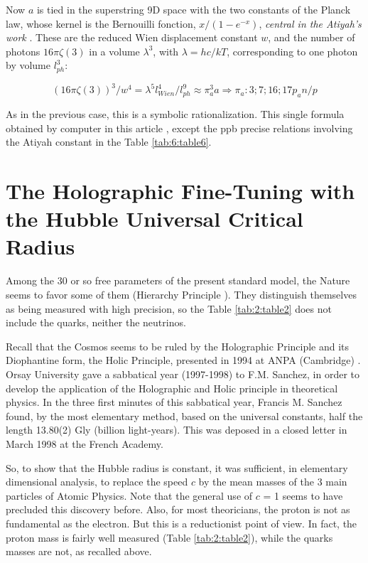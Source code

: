 \documentclass[a4paper,9pt]{article}
\begin{document}
Now $a$ is tied in the superstring 9D space with the two constants of the Planck law, whose kernel is the Bernouilli fonction, $x/(1-e^{-x})$, \textit {central in the Atiyah's work} \cite{Atiyah}. These are the reduced Wien displacement constant $w$, and the number of photons $16\pi \zeta(3)$ in a volume $\lambda^3$, with $\lambda = hc/kT $, corresponding to one photon by volume $l_{ph}^3$:

\begin{equation}
(16\pi\zeta(3))^3/w^4 = \lambda^5l_{Wien}^4/l_{ph}^9 \approx \pi_a^3a    \Rightarrow     \pi_a: 3;7;16;17p_an/p
\end{equation}

As in the previous case, this is a symbolic rationalization. This single formula obtained by computer in this article \cite{LaGuer}, except the ppb precise relations involving the Atiyah constant in the Table \ref{tab:6:table6}.








\section{The Holographic Fine-Tuning with the Hubble Universal Critical Radius}

Among the 30 or so free parameters of the present standard model, the Nature seems to favor some of them (Hierarchy Principle \cite{Sanchez}). They distinguish themselves as being measured with high precision, so the Table \ref{tab:2:table2} does not include the quarks, neither the neutrinos. 

Recall that the Cosmos seems to be ruled by the Holographic Principle and its Diophantine form, the Holic Principle, presented in 1994 at ANPA (Cambridge)  \cite{Sanchez1}. Orsay University gave a sabbatical year (1997-1998) to F.M. Sanchez, in order to develop the application of the Holographic and Holic principle in theoretical physics. In the three first minutes of this sabbatical year, Francis M. Sanchez found, by the most elementary method, based on the universal constants, half the length 13.80(2) Gly (billion light-years). This was deposed in a closed letter in March 1998 at the French Academy. 


So, to show that the Hubble radius is constant, it was sufficient, in elementary dimensional analysis, to replace the speed $c$ by the mean masses of the 3 main particles of Atomic Physics. Note that the general use of $c$ = 1 seems to have precluded this discovery before. Also, for most theoricians, the proton is not as fundamental as the electron. But this is a reductionist point of view. In fact, the proton mass is fairly well measured (Table \ref{tab:2:table2}), while the quarks masses are not, as recalled above.
 
\end{document}
